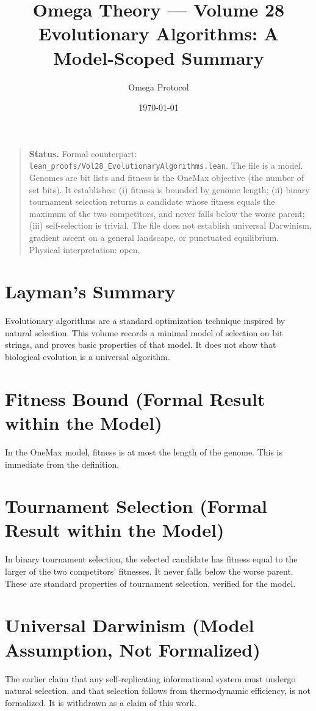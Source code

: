 \documentclass[11pt, a4paper]{article}
\title{Omega Theory --- Volume 28\\\Large Evolutionary Algorithms: A Model-Scoped Summary}
\author{Omega Protocol}
\date{\today}
\begin{document}
\maketitle

\begin{quote}
\textbf{Status.} Formal counterpart: \texttt{lean\_proofs/Vol28\_EvolutionaryAlgorithms.lean}. The file is a model. Genomes are bit lists and fitness is the OneMax objective (the number of set bits). It establishes: (i) fitness is bounded by genome length; (ii) binary tournament selection returns a candidate whose fitness equals the maximum of the two competitors, and never falls below the worse parent; (iii) self-selection is trivial. The file does not establish universal Darwinism, gradient ascent on a general landscape, or punctuated equilibrium. Physical interpretation: open.
\end{quote}

\section*{Layman's Summary}
Evolutionary algorithms are a standard optimization technique inspired by natural selection. This volume records a minimal model of selection on bit strings, and proves basic properties of that model. It does not show that biological evolution is a universal algorithm.

\section{Fitness Bound (Formal Result within the Model)}
In the OneMax model, fitness is at most the length of the genome. This is immediate from the definition.

\section{Tournament Selection (Formal Result within the Model)}
In binary tournament selection, the selected candidate has fitness equal to the larger of the two competitors' fitnesses. It never falls below the worse parent. These are standard properties of tournament selection, verified for the model.

\section{Universal Darwinism (Model Assumption, Not Formalized)}
The earlier claim that any self-replicating informational system must undergo natural selection, and that selection follows from thermodynamic efficiency, is not formalized. It is withdrawn as a claim of this work.
\end{document}
